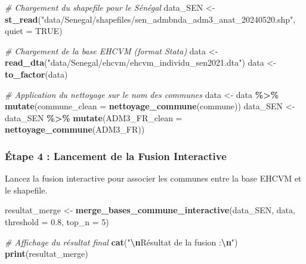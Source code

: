 \documentclass[
]{article}
\newenvironment{Shaded}{\begin{snugshade}}{\end{snugshade}}
\newcommand{\AttributeTok}[1]{\textcolor[rgb]{0.13,0.29,0.53}{#1}}
\newcommand{\CommentTok}[1]{\textcolor[rgb]{0.56,0.35,0.01}{\textit{#1}}}
\newcommand{\ConstantTok}[1]{\textcolor[rgb]{0.56,0.35,0.01}{#1}}
\newcommand{\DecValTok}[1]{\textcolor[rgb]{0.00,0.00,0.81}{#1}}
\newcommand{\FloatTok}[1]{\textcolor[rgb]{0.00,0.00,0.81}{#1}}
\newcommand{\FunctionTok}[1]{\textcolor[rgb]{0.13,0.29,0.53}{\textbf{#1}}}
\newcommand{\NormalTok}[1]{#1}
\newcommand{\OtherTok}[1]{\textcolor[rgb]{0.56,0.35,0.01}{#1}}
\newcommand{\SpecialCharTok}[1]{\textcolor[rgb]{0.81,0.36,0.00}{\textbf{#1}}}
\newcommand{\StringTok}[1]{\textcolor[rgb]{0.31,0.60,0.02}{#1}}
\begin{document}
\begin{Shaded}
\begin{Highlighting}[]
\CommentTok{\# Chargement du shapefile pour le Sénégal}
\NormalTok{data\_SEN }\OtherTok{\textless{}{-}} \FunctionTok{st\_read}\NormalTok{(}\StringTok{"data/Senegal/shapefiles/sen\_admbnda\_adm3\_anat\_20240520.shp"}\NormalTok{, }\AttributeTok{quiet =} \ConstantTok{TRUE}\NormalTok{)}

\CommentTok{\# Chargement de la base EHCVM (format Stata)}
\NormalTok{data }\OtherTok{\textless{}{-}} \FunctionTok{read\_dta}\NormalTok{(}\StringTok{"data/Senegal/ehcvm/ehcvm\_individu\_sen2021.dta"}\NormalTok{)}
\NormalTok{data }\OtherTok{\textless{}{-}} \FunctionTok{to\_factor}\NormalTok{(data)}

\CommentTok{\# Application du nettoyage sur le nom des communes}
\NormalTok{data }\OtherTok{\textless{}{-}}\NormalTok{ data }\SpecialCharTok{\%\textgreater{}\%} \FunctionTok{mutate}\NormalTok{(}\AttributeTok{commune\_clean =} \FunctionTok{nettoyage\_commune}\NormalTok{(commune))}
\NormalTok{data\_SEN }\OtherTok{\textless{}{-}}\NormalTok{ data\_SEN }\SpecialCharTok{\%\textgreater{}\%} \FunctionTok{mutate}\NormalTok{(}\AttributeTok{ADM3\_FR\_clean =} \FunctionTok{nettoyage\_commune}\NormalTok{(ADM3\_FR))}
\end{Highlighting}
\end{Shaded}

\hypertarget{uxe9tape-4-lancement-de-la-fusion-interactive}{%
\subsubsection{Étape 4 : Lancement de la Fusion
Interactive}\label{uxe9tape-4-lancement-de-la-fusion-interactive}}

Lancez la fusion interactive pour associer les communes entre la base
EHCVM et le shapefile.

\begin{Shaded}
\begin{Highlighting}[]
\NormalTok{resultat\_merge }\OtherTok{\textless{}{-}} \FunctionTok{merge\_bases\_commune\_interactive}\NormalTok{(data\_SEN, data, }\AttributeTok{threshold =} \FloatTok{0.8}\NormalTok{, }\AttributeTok{top\_n =} \DecValTok{5}\NormalTok{)}

\CommentTok{\# Affichage du résultat final}
\FunctionTok{cat}\NormalTok{(}\StringTok{"}\SpecialCharTok{\textbackslash{}n}\StringTok{Résultat de la fusion :}\SpecialCharTok{\textbackslash{}n}\StringTok{"}\NormalTok{)}
\FunctionTok{print}\NormalTok{(resultat\_merge)}
\end{Highlighting}
\end{Shaded}
\end{document}
